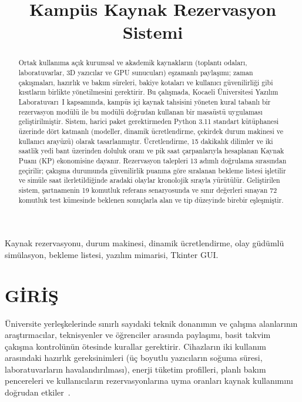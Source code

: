 \documentclass[conference]{IEEEtran}
\begin{document}
\shorthandoff{=}

\title{Kampüs Kaynak Rezervasyon Sistemi}

\author{
}

\maketitle

\begin{abstract}
Ortak kullanıma açık kurumsal ve akademik kaynakların (toplantı odaları, laboratuvarlar, 3D yazıcılar ve GPU sunucuları) eşzamanlı paylaşımı; zaman çakışmaları, hazırlık ve bakım süreleri, bakiye kotaları ve kullanıcı güvenilirliği gibi kısıtların birlikte yönetilmesini gerektirir. Bu çalışmada, Kocaeli Üniversitesi Yazılım Laboratuvarı~I kapsamında, kampüs içi kaynak tahsisini yöneten kural tabanlı bir rezervasyon modülü ile bu modülü doğrudan kullanan bir masaüstü uygulaması geliştirilmiştir. Sistem, harici paket gerektirmeden Python 3.11 standart kütüphanesi üzerinde dört katmanlı (modeller, dinamik ücretlendirme, çekirdek durum makinesi ve kullanıcı arayüzü) olarak tasarlanmıştır. Ücretlendirme, 15 dakikalık dilimler ve iki saatlik yedi bant üzerinden doluluk oranı ve pik saat çarpanlarıyla hesaplanan Kaynak Puanı (KP) ekonomisine dayanır. Rezervasyon talepleri 13 adımlı doğrulama sırasından geçirilir; çakışma durumunda güvenilirlik puanına göre sıralanan bekleme listesi işletilir ve simüle saat ilerletildiğinde aradaki olaylar kronolojik sırayla yürütülür. Geliştirilen sistem, şartnamenin 19 komutluk referans senaryosunda ve sınır değerleri sınayan 72 komutluk test kümesinde beklenen sonuçlarla alan ve tip düzeyinde birebir eşleşmiştir.
\end{abstract}

\begin{IEEEkeywords}
Kaynak rezervasyonu, durum makinesi, dinamik ücretlendirme, olay güdümlü simülasyon, bekleme listesi, yazılım mimarisi, Tkinter GUI.
\end{IEEEkeywords}

\section{GİRİŞ}
Üniversite yerleşkelerinde sınırlı sayıdaki teknik donanımın ve çalışma alanlarının araştırmacılar, teknisyenler ve öğrenciler arasında paylaşımı, basit takvim çakışma kontrolünün ötesinde kurallar gerektirir. Cihazların iki kullanım arasındaki hazırlık gereksinimleri (üç boyutlu yazıcıların soğuma süresi, laboratuvarların havalandırılması), enerji tüketim profilleri, planlı bakım pencereleri ve kullanıcıların rezervasyonlarına uyma oranları kaynak kullanımını doğrudan etkiler~\cite{coffman1996, rexford2009}.
\end{document}
